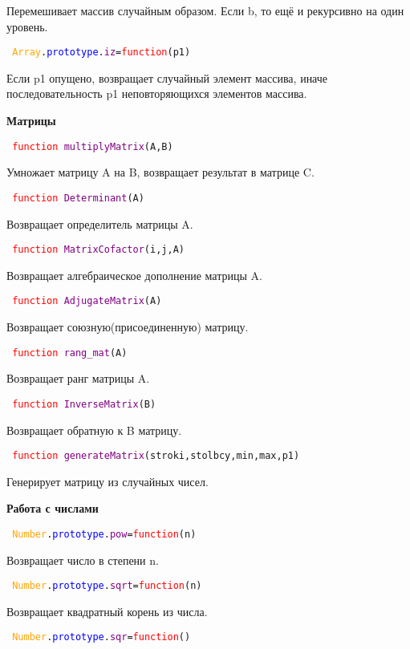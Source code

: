 Перемешивает массив случайным образом. Если b, то ещё и рекурсивно на один уровень.

\hypertarget{iz}{\texttt{
	\textcolor{Orange}{Array}.\textcolor{Blue}{prototype}.\textcolor{Purple}{iz}=\textcolor{Red}{function}(p1)
}}

Если p1 опущено, возвращает случайный элемент массива, иначе последовательность p1 неповторяющихся элементов массива.

\textbf{Матрицы}

\texttt{
	\textcolor{Red}{function} \textcolor{Purple}{multiplyMatrix}(A,B)
}

Умножает матрицу A на B, возвращает результат в матрице C.

\texttt{
	\textcolor{Red}{function} \textcolor{Purple}{Determinant}(A)
}

Возвращает определитель матрицы A.

\texttt{
	\textcolor{Red}{function} \textcolor{Purple}{MatrixCofactor}(i,j,A)
}

Возвращает алгебраическое дополнение матрицы A.

\texttt{
	\textcolor{Red}{function} \textcolor{Purple}{AdjugateMatrix}(A)
}

Возвращает союзную(присоединенную) матрицу.

\texttt{
	\textcolor{Red}{function} \textcolor{Purple}{rang\_mat}(А)
}

Возвращает ранг матрицы A.

\texttt{
	\textcolor{Red}{function} \textcolor{Purple}{InverseMatrix}(B)
}

Возвращает обратную  к B матрицу.

\texttt{
	\textcolor{Red}{function} \textcolor{Purple}{generateMatrix}(stroki,stolbcy,min,max,p1)
}

Генерирует матрицу из случайных чисел.

\textbf{Работа с числами}

\texttt{
	\textcolor{Orange}{Number}.\textcolor{Blue}{prototype}.\textcolor{Purple}{pow}=\textcolor{Red}{function}(n)
}

Возвращает число в степени n.

\texttt{
	\textcolor{Orange}{Number}.\textcolor{Blue}{prototype}.\textcolor{Purple}{sqrt}=\textcolor{Red}{function}(n)
}

Возвращает квадратный корень из числа.

\texttt{
	\textcolor{Orange}{Number}.\textcolor{Blue}{prototype}.\textcolor{Purple}{sqr}=\textcolor{Red}{function}()
}

